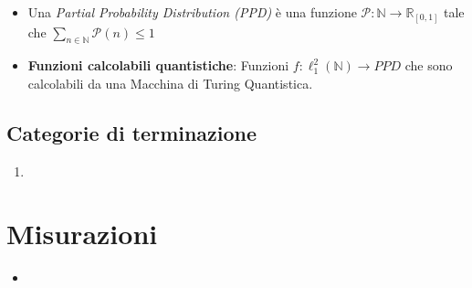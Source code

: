 \documentclass{beamer}
\begin{document}
\begin{frame}{\secname}{}
	\begin{itemize}
		\item Una \textit{Partial Probability Distribution (PPD)} è una funzione \( \mathcal{P} : \mathbb{N} \rightarrow \mathbb{R}_{[0,1]} \) tale che \( \sum_{n \in \mathbb{N}} \mathcal{P} \left ( n \right ) \le 1 \)
		\item \textbf{Funzioni calcolabili quantistiche}: Funzioni \( f : \ell^{2}_{1} \left ( \mathbb{N} \right ) \rightarrow PPD \) che sono calcolabili da una Macchina di Turing Quantistica.
	\end{itemize}
\end{frame}

\subsection{Categorie di terminazione}

\begin{frame}{\subsecname}{}
	\begin{enumerate}
		\item
	\end{enumerate}
\end{frame}

\section{Misurazioni}

\begin{frame}{\secname}{}
	\begin{itemize}
		\item
	\end{itemize}
\end{frame}
\end{document}
